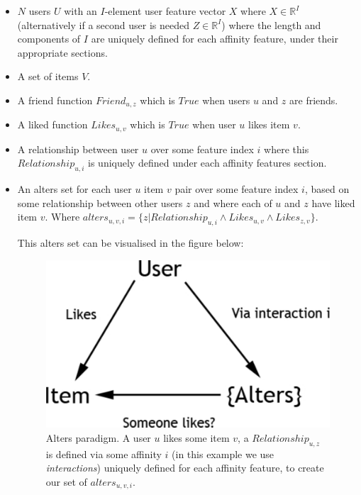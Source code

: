 \begin{itemize}
\item $N$ users $U$ with an $I$-element user feature vector $X$ where $X \in \mathbb{R}^I$ (alternatively if a second user is needed $Z \in \mathbb{R}^I$) 
where the length and components of $I$ are uniquely defined for each affinity feature, under their appropriate sections.
\item A set of items $V$.
\item A friend function $Friend_{u,z}$ which is $True$ when users $u$ and $z$ are friends.
\item A liked function $Likes_{u,v}$ which is $True$ when user $u$ likes item $v$.
\item A relationship between user $u$ over some feature index $i$ where this $Relationship_{u,i}$ is uniquely defined under each affinity features section.
\item An alters set for each user $u$ item $v$ pair over some feature index $i$, based on some relationship between other users $z$ and where each of $u$ and $z$ have liked item $v$. 
Where $alters_{u,v,i} = \{z | Relationship_{u,i} \wedge Likes_{u,v} \wedge Likes_{z,v}\}$.

\clearpage
This alters set can be visualised in the figure below:

\begin{figure}[tbh!]
	\begin{center}
		\includegraphics[scale=0.60]{imgs/alters.pdf}
		\caption{Alters paradigm. A user $u$ likes some item $v$, a $Relationship_{u,z}$ is defined via some affinity $i$ (in this example we use \emph{interactions}) uniquely defined
		for each affinity feature, to create our set of $alters_{u,v,i}$.}
	\end{center}
\end{figure}


\end{itemize}
